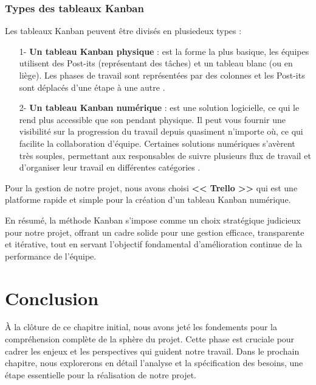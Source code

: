     \subsubsection{Types des tableaux Kanban}
    \par Les tableaux Kanban peuvent être divisés en plusiedeux types :
    \begin{enumerate}
        \item[1-]\textbf{Un tableau Kanban physique }: est la forme la plus basique, les équipes utilisent des Post-its (représentant des tâches) et un tableau blanc (ou en liège). 
        Les phases de travail sont représentées par des colonnes et les Post-its sont déplacés d'une étape à une autre \cite{tableau}.
        \item[2-]\textbf{Un tableau Kanban numérique }: est une solution logicielle, ce qui le rend plus accessible que son pendant physique. Il peut vous fournir une visibilité sur la progression du travail depuis quasiment n'importe où, ce qui facilite la collaboration d'équipe. 
        Certaines solutions numériques s'avèrent très souples, permettant aux responsables de suivre plusieurs flux de travail et d'organiser leur travail en différentes catégories \cite{tableau}.
    \end{enumerate}
\par Pour la gestion de notre projet, nous avons choisi \textbf{<< Trello >>} qui est une platforme rapide et simple pour la création d'un tableau Kanban numérique.


\par En résumé, la méthode Kanban s'impose comme un choix stratégique judicieux pour notre projet, offrant un cadre solide pour une gestion efficace, transparente et itérative, tout en servant l'objectif fondamental d'amélioration continue de la performance de l'équipe.

\section*{Conclusion}
   À la clôture de ce chapitre initial, nous avons jeté les fondements pour la compréhension complète de la sphère du projet. Cette phase est cruciale pour cadrer les enjeux et les perspectives qui guident notre travail. Dans le prochain chapitre, nous explorerons en détail l'analyse et la spécification des besoins, une étape essentielle pour la réalisation de notre projet.